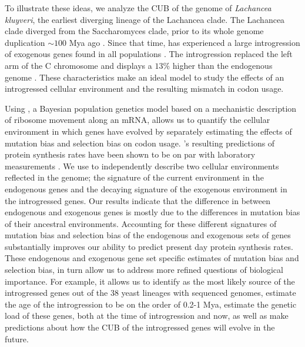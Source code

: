To illustrate these ideas, we analyze the CUB of the genome of \emph{Lachancea kluyveri}, the earliest diverging lineage of the Lachancea clade.
The Lachancea clade diverged from the Saccharomyces clade, prior to its whole genome duplication $\sim 100$ Mya ago \citep{MHM2015,Beimforde2014}.
Since that time, \kluyveri has experienced a large introgression of exogenous genes found in all populations \citep{friedrich2015}.
The introgression replaced the left arm of the C chromosome and displays a $13 \%$ higher \GC than the endogenous \kluyveri genome \citep{payen2009, friedrich2015}.
These characteristics make \kluyveri an ideal model to study the effects of an introgressed cellular environment and the resulting mismatch in codon usage.

Using \ROC, a Bayesian population genetics model based on a mechanistic description of ribosome movement along an mRNA, allows us to quantify the cellular environment in which genes have evolved by separately estimating the effects of mutation bias and selection bias on codon usage.
\ROC's resulting predictions of protein synthesis rates have been shown to be on par with laboratory measurements \citep{ShahAndGilchrist2011, gilchrist2015}.
We use \ROC to independently describe two cellular environments reflected in the \kluyveri genome; the signature of the current environment in the endogenous genes and the decaying signature of the exogenous environment in the introgressed genes.
Our results indicate that the difference in \GC between endogenous and exogenous genes is mostly due to the differences in mutation bias of their ancestral environments.
Accounting for these different signatures of mutation bias and selection bias of the endogenous and exogenous sets of genes substantially improves our ability to predict present day protein synthesis rates.
These endogenous and exogenous gene set specific estimates of mutation bias and selection bias, in turn allow us to address more refined questions of biological importance.
For example, it allows us to identify \gossypii as the most likely source of the introgressed genes out of the 38 yeast lineages with sequenced genomes, estimate the age of the introgression to be on the order of 0.2-1 Mya, estimate the genetic load of these genes, both at the time of introgression and now, as well as make predictions about how the CUB of the introgressed genes will evolve in the future.

